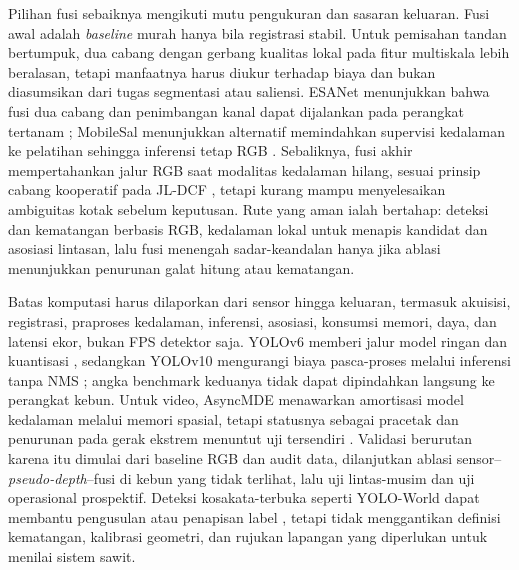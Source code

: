 Pilihan fusi sebaiknya mengikuti mutu pengukuran dan sasaran keluaran. Fusi
awal adalah \textit{baseline} murah hanya bila registrasi stabil. Untuk
pemisahan tandan bertumpuk, dua cabang dengan gerbang kualitas lokal pada fitur
multiskala lebih beralasan, tetapi manfaatnya harus diukur terhadap biaya dan
bukan diasumsikan dari tugas segmentasi atau saliensi. ESANet menunjukkan bahwa
fusi dua cabang dan penimbangan kanal dapat dijalankan pada perangkat tertanam
\cite{seichter2021esanet}; MobileSal menunjukkan alternatif memindahkan
supervisi kedalaman ke pelatihan sehingga inferensi tetap RGB \cite{wu2022mobilesal}.
Sebaliknya, fusi akhir mempertahankan jalur RGB saat modalitas kedalaman hilang,
sesuai prinsip cabang kooperatif pada JL-DCF \cite{fu2020jldcf}, tetapi kurang
mampu menyelesaikan ambiguitas kotak sebelum keputusan. Rute yang aman ialah
bertahap: deteksi dan kematangan berbasis RGB, kedalaman lokal untuk menapis
kandidat dan asosiasi lintasan, lalu fusi menengah sadar-keandalan hanya jika
ablasi menunjukkan penurunan galat hitung atau kematangan.

Batas komputasi harus dilaporkan dari sensor hingga keluaran, termasuk
akuisisi, registrasi, praproses kedalaman, inferensi, asosiasi, konsumsi memori,
daya, dan latensi ekor, bukan FPS detektor saja. YOLOv6 memberi jalur model
ringan dan kuantisasi \cite{li2022yolov6}, sedangkan YOLOv10 mengurangi biaya
pasca-proses melalui inferensi tanpa NMS \cite{wang2024yolov10}; angka benchmark
keduanya tidak dapat dipindahkan langsung ke perangkat kebun. Untuk video,
AsyncMDE menawarkan amortisasi model kedalaman melalui memori spasial, tetapi
statusnya sebagai pracetak dan penurunan pada gerak ekstrem menuntut uji
tersendiri \cite{ma2026asyncmde}. Validasi berurutan karena itu dimulai dari
baseline RGB dan audit data, dilanjutkan ablasi sensor--\textit{pseudo-depth}--fusi
di kebun yang tidak terlihat, lalu uji lintas-musim dan uji operasional prospektif.
Deteksi kosakata-terbuka seperti YOLO-World dapat membantu pengusulan atau
penapisan label \cite{cheng2024yoloworld}, tetapi tidak menggantikan definisi
kematangan, kalibrasi geometri, dan rujukan lapangan yang diperlukan untuk
menilai sistem sawit.


